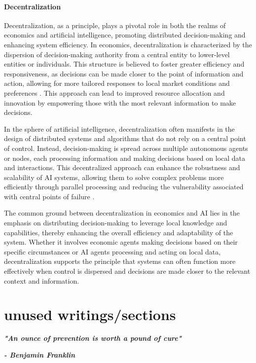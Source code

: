 \documentclass{article}
\begin{document}
\paragraph{Decentralization}
Decentralization, as a principle, plays a pivotal role in both the realms of economics and artificial intelligence, promoting distributed decision-making and enhancing system efficiency. In economics, decentralization is characterized by the dispersion of decision-making authority from a central entity to lower-level entities or individuals. This structure is believed to foster greater efficiency and responsiveness, as decisions can be made closer to the point of information and action, allowing for more tailored responses to local market conditions and preferences \cite{ochsner_decentralization_2017}. This approach can lead to improved resource allocation and innovation by empowering those with the most relevant information to make decisions.

In the sphere of artificial intelligence, decentralization often manifests in the design of distributed systems and algorithms that do not rely on a central point of control. Instead, decision-making is spread across multiple autonomous agents or nodes, each processing information and making decisions based on local data and interactions. This decentralized approach can enhance the robustness and scalability of AI systems, allowing them to solve complex problems more efficiently through parallel processing and reducing the vulnerability associated with central points of failure \cite{tanenbaum_distributed_2017}.

The common ground between decentralization in economics and AI lies in the emphasis on distributing decision-making to leverage local knowledge and capabilities, thereby enhancing the overall efficiency and adaptability of the system. Whether it involves economic agents making decisions based on their specific circumstances or AI agents processing and acting on local data, decentralization supports the principle that systems can often function more effectively when control is dispersed and decisions are made closer to the relevant context and information.


\section{unused writings/sections}


\noindent \begin{center}\begin{minipage}[t]{0.9\columnwidth}
    \textbf{\textit{"An ounce of prevention is worth a pound of cure"}}\par
    \textbf{\textit{- Benjamin Franklin}}
\end{minipage}\end{center} 
\vspace{0.05in}
\end{document}
